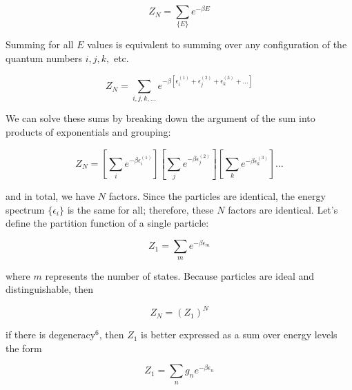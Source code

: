 \documentclass[12pt,a4paper]{report}
\newcommand{\esp}{\vspace{0.5cm}}
\begin{document}
\esp

\begin{equation}
	Z_N = \sum_{\{E\}} e^{-\beta E} \tag{5.74}
\end{equation}

\esp

Summing for all $E$ values is equivalent to summing over any configuration of the quantum numbers $i, j, k,$ etc.

\esp

\begin{equation}
	Z_N = \sum_{i,j,k,\dots} e^{-\beta [\epsilon_i^{(1)} + \epsilon_j^{(2)} + \epsilon_k^{(3)} + \dots]} \tag{5.75}
\end{equation}

\esp

We can solve these sums by breaking down the argument of the sum into products of exponentials and grouping:

\esp

\begin{equation}
	Z_N = \left[ \sum_{i} e^{-\beta \epsilon_i^{(1)}} \right] \left[ \sum_{j} e^{-\beta \epsilon_j^{(2)}} \right] \left[ \sum_{k} e^{-\beta \epsilon_k^{(3)}} \right] \dots \tag{5.76}
\end{equation}

\esp

and in total, we have $N$ factors. Since the particles are identical, the energy spectrum $\{\epsilon_i\}$ is the same for all; therefore, these $N$ factors are identical. Let's define the partition function of a single particle:

\esp

\begin{equation}
	Z_1 = \sum_{m} e^{-\beta \epsilon_m} \tag{5.77}
\end{equation}

\esp

where $m$ represents the number of states. Because particles are ideal and distinguishable, then

\esp

\begin{equation}
	Z_N = (Z_1)^N \tag{5.78}
\end{equation}

\esp

if there is degeneracy$^6$, then $Z_1$ is better expressed as a sum over energy levels the form

\esp

\begin{equation}
	Z_1 = \sum_{n} g_n e^{-\beta \epsilon_n} \tag{5.79}
\end{equation}
\end{document}
